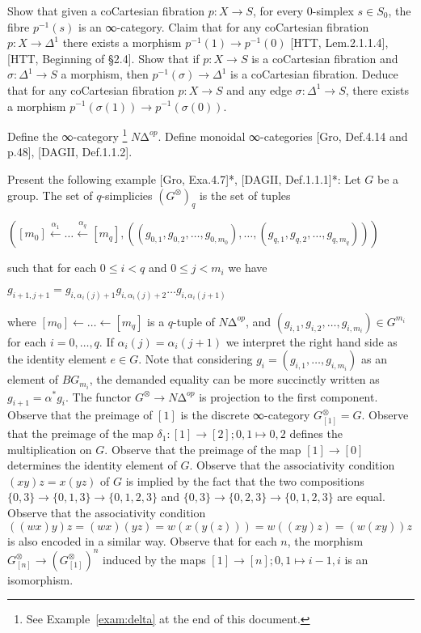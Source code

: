 \documentclass[a4paper]{amsart}
\numberwithin{figure}{section}
\theoremstyle{theorem}
\theoremstyle{definition}
\begin{document}
Show that given a coCartesian fibration $p: X {\to} S$, for every 0-simplex $s \in S_0$, the fibre $p^{-1}(s)$ is an ∞-category. %
Claim that for any coCartesian fibration $p: X {\to} \Delta^1$ there exists a morphism $p^{-1}(1) \to p^{-1}(0)$ [HTT, Lem.2.1.1.4], [HTT, Beginning of §2.4]. %
Show that if $p: X{\to}S$ is a coCartesian fibration and $\sigma: \Delta^1 {\to}S$ a morphism, then $p^{-1}(\sigma) \to \Delta^1$ is a coCartesian fibration. %
Deduce that for any coCartesian fibration $p: X \to S$ and any edge $\sigma: \Delta^1 \to S$, there exists a morphism $p^{-1}(\sigma(1)) \to p^{-1}(\sigma(0))$. %

Define the ∞-category%
\footnote{%
See Example~\ref{exam:delta} at the end of this document.%
} %
 $N∆^{op}$. %
 Define monoidal ∞-categories [Gro, Def.4.14 and p.48], [DAGII, Def.1.1.2]. %

Present the following example [Gro, Exa.4.7]*, [DAGII, Def.1.1.1]*: Let $G$ be a group. 
The set of $q$-simplicies $(G^\otimes)_q$ is the set of tuples 
%
\begin{center}
$([m_0] {\stackrel{\alpha_1}{\leftarrow}} \dots {\stackrel{\alpha_q}{\leftarrow}} [m_q], ((g_{0,1}, g_{0,2}, \dots, g_{0, m_0}), \dots, (g_{q,1}, g_{q,2}, \dots, g_{q, m_q})))$
\end{center}
%
such that for each $0 ≤ i < q$ and $0 ≤ j < m_i$ we have %
\begin{center}
$g_{i{+}1,j{+}1} = g_{i,\alpha_i(j)+1}g_{i,\alpha_i(j)+2}\dots g_{i,\alpha_i(j{+}1)}$
\end{center} %
where $[m_0] {\leftarrow} \dots {\leftarrow} [m_q]$ is a $q$-tuple of $N∆^{op}$, and $(g_{i,1}, g_{i,2}, \dots, g_{i, m_i}) \in G^{m_i}$ for each $i = 0, \dots, q$. If $\alpha_i(j) = \alpha_i(j{+}1)$ we interpret the right hand side as the identity element $e \in G$. Note that considering $g_i = (g_{i,1}, \dots, g_{i, m_i})$ as an element of $BG_{m_i}$, the demanded equality can be more succinctly written as $g_{i+1} = \alpha^*g_i$. %
The functor $G^\otimes \to N∆^{op}$ is projection to the first component. %
Observe that the preimage of $[1]$ is the discrete ∞-category $G^\otimes_{[1]} = G$. %
Observe that the preimage of the map $\delta_1: [1] {→} [2]; 0,1 \mapsto 0,2$ defines the multiplication on $G$. %
Observe that the preimage of the map $[1] → [0]$ determines the identity element of $G$. %
Observe that the associativity condition $(xy)z = x(yz)$ of $G$ is implied by the fact that the two compositions $\{0,3\} → \{0,1,3\} → \{0,1,2,3\}$ and $\{0,3\} → \{0,2,3\} → \{0,1,2,3\}$ are equal. %
Observe that the associativity condition $((wx)y)z = (wx)(yz) = w(x(y(z))) = w((xy)z) = (w(xy))z$ is also encoded in a similar way. %
Observe that for each $n$, the morphism $G^\otimes_{[n]} \to (G^\otimes_{[1]})^n$ induced by the maps $[1] {→} [n]; 0,1 \mapsto i{-}1,i$ is an isomorphism. %
\end{document}
